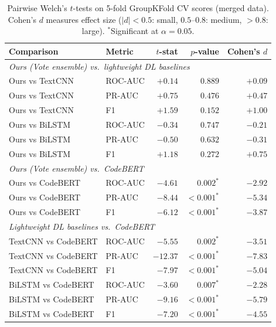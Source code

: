 \begin{table}[t]
\centering
\caption{Pairwise Welch's $t$-tests on 5-fold GroupKFold CV scores (merged data). Cohen's $d$ measures effect size ($|d|<0.5$: small, $0.5$--$0.8$: medium, $>0.8$: large). $^{*}$Significant at $\alpha = 0.05$.}
\label{tab:significance}
\small
\setlength{\tabcolsep}{3.5pt}
\begin{tabular}{llrrr}
\toprule
Comparison & Metric & $t$-stat & $p$-value & Cohen's $d$ \\
\midrule
\multicolumn{5}{l}{\textit{Ours (Vote ensemble) vs.\ lightweight DL baselines}} \\
Ours vs TextCNN & ROC-AUC & $+0.14$ & $0.889$ & $+0.09$ \\
Ours vs TextCNN & PR-AUC & $+0.75$ & $0.476$ & $+0.47$ \\
Ours vs TextCNN & F1 & $+1.59$ & $0.152$ & $+1.00$ \\
Ours vs BiLSTM & ROC-AUC & $-0.34$ & $0.747$ & $-0.21$ \\
Ours vs BiLSTM & PR-AUC & $-0.50$ & $0.632$ & $-0.31$ \\
Ours vs BiLSTM & F1 & $+1.18$ & $0.272$ & $+0.75$ \\
\midrule
\multicolumn{5}{l}{\textit{Ours (Vote ensemble) vs.\ CodeBERT}} \\
Ours vs CodeBERT & ROC-AUC & $-4.61$ & $0.002^{*}$ & $-2.92$ \\
Ours vs CodeBERT & PR-AUC & $-8.44$ & ${<}0.001^{*}$ & $-5.34$ \\
Ours vs CodeBERT & F1 & $-6.12$ & ${<}0.001^{*}$ & $-3.87$ \\
\midrule
\multicolumn{5}{l}{\textit{Lightweight DL baselines vs.\ CodeBERT}} \\
TextCNN vs CodeBERT & ROC-AUC & $-5.55$ & $0.002^{*}$ & $-3.51$ \\
TextCNN vs CodeBERT & PR-AUC & $-12.37$ & ${<}0.001^{*}$ & $-7.83$ \\
TextCNN vs CodeBERT & F1 & $-7.97$ & ${<}0.001^{*}$ & $-5.04$ \\
BiLSTM vs CodeBERT & ROC-AUC & $-3.60$ & $0.007^{*}$ & $-2.28$ \\
BiLSTM vs CodeBERT & PR-AUC & $-9.16$ & ${<}0.001^{*}$ & $-5.79$ \\
BiLSTM vs CodeBERT & F1 & $-7.20$ & ${<}0.001^{*}$ & $-4.55$ \\
\bottomrule
\end{tabular}
\end{table}
